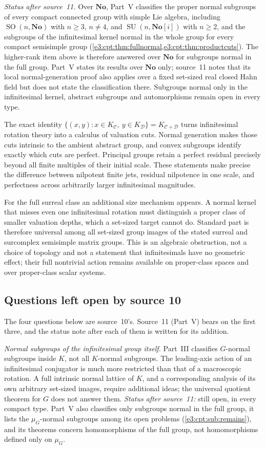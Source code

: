 \documentclass[11pt,letterpaper]{article}
\numberwithin{equation}{section}
\theoremstyle{definition}
\theoremstyle{remark}
\newcommand{\No}{\mathbf{No}}
\newcommand{\SO}{\operatorname{SO}}
\newcommand{\SU}{\operatorname{SU}}
\newcommand{\comm}[2]{\left(#1,#2\right)}
\newcommand{\commset}[2]{\{\comm{x}{y}:x\in #1,\ y\in #2\}}
\begin{document}
\emph{Status after source~11.} Over $\No$, Part~V classifies the proper normal
subgroups of every compact connected group with simple Lie algebra, including
$\SO(n,\No)$ with $n\ge3$, $n\ne4$, and $\SU(n,\No[i])$ with $n\ge2$, and the
subgroups of the infinitesimal kernel normal in the whole group for every compact
semisimple group (\cref{e3:cpt:thm:fullnormal,e3:cpt:thm:productcuts}). The
higher-rank item above is therefore answered over $\No$ for subgroups normal in
the full group. Part~V states its results over $\No$ only; source~11 notes that
its local normal-generation proof also applies over a fixed set-sized real
closed Hahn field but does not state the classification there. Subgroups normal
only in the infinitesimal kernel, abstract subgroups and automorphisms remain
open in every type.

The exact identity
$\commset{K_{\mathcal C}}{K_{\mathcal D}}=K_{\mathcal C+\mathcal D}$ turns
infinitesimal rotation theory into a calculus of valuation cuts. Normal
generation makes those cuts intrinsic to the ambient abstract group, and convex
subgroups identify exactly which cuts are perfect. Principal groups retain a
perfect residual precisely beyond all finite multiples of their initial scale.
These statements make precise the difference between nilpotent finite jets,
residual nilpotence in one scale, and perfectness across arbitrarily larger
infinitesimal magnitudes.

For the full surreal class an additional size mechanism appears. A normal kernel
that misses even one infinitesimal rotation must distinguish a proper class of
smaller valuation depths, which a set-sized target cannot do. Standard part is
therefore universal among all set-sized group images of the stated surreal and
surcomplex semisimple matrix groups. This is an algebraic obstruction, not a
choice of topology and not a statement that infinitesimals have no geometric
effect; their full nontrivial action remains available on proper-class spaces
and over proper-class scalar systems.

\subsection{Questions left open by source 10}\label{e3:cut:sub:open}

The four questions below are source~10's. Source~11 (Part~V) bears on the first
three, and the status note after each of them is written for its addition.

\emph{Normal subgroups of the infinitesimal group itself.} Part~III classifies
$G$-normal subgroups inside $K$, not all $K$-normal subgroups. The leading-axis
action of an infinitesimal conjugator is much more restricted than that of a
macroscopic rotation. A full intrinsic normal lattice of $K$, and a
corresponding analysis of its own arbitrary set-sized images, require
additional ideas; the universal quotient theorem for $G$ does not answer them.
\emph{Status after source~11:} still open, in every compact type. Part~V also
classifies only subgroups normal in the full group, it lists the $\mu_G$-normal
subgroups among its open problems (\cref{e3:cpt:sub:remains}), and its theorems
concern homomorphisms of the full group, not homomorphisms defined only on
$\mu_G$.
\end{document}
